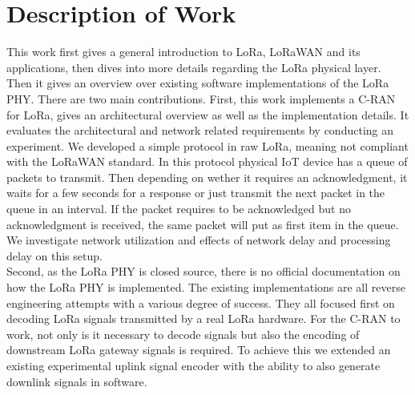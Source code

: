\section{Description of Work}
This work first gives a general introduction to LoRa, LoRaWAN and its applications, then dives 
into more details regarding the LoRa physical layer. Then it gives an overview over existing 
software implementations of the LoRa PHY. There are two main contributions. First, this work 
implements a C-RAN for LoRa, gives an architectural overview as well as the implementation details.
It evaluates the architectural and network related requirements by conducting an experiment. We developed a simple protocol in raw LoRa,
meaning not compliant with the LoRaWAN standard. In this protocol physical IoT device has a queue of packets to transmit. Then depending on 
wether it requires an acknowledgment, it waits for a few seconds for a response or just transmit the next packet in the queue in an interval.
If the packet requires to be acknowledged but no acknowledgment is received, the same packet will put as first item in the queue.
We investigate network utilization and effects of network delay and processing delay on this setup.
\\
Second, as the LoRa PHY is closed source, there is no official documentation on how the LoRa PHY is implemented.
The existing implementations are all reverse engineering attempts with a various degree of success. 
They all focused first on decoding LoRa signals transmitted by a real LoRa hardware. For the C-RAN to work, not only is it 
necessary to decode signals but also the encoding of downstream LoRa gateway signals is required. To achieve this we extended 
an existing experimental uplink signal encoder with the ability to also generate downlink signals in software.

